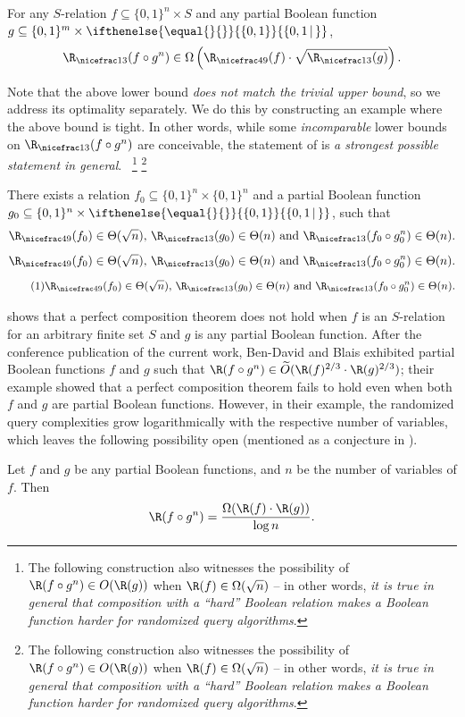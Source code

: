 \documentclass{toc}
\newcommand{\relation}{$S$-relation\xspace}     %
\newcommand{\md}{\middle}
\newcommand{\malabel}[1]{\addtocounter{equation}{1}\tag{\theequation}\label{#1}}
\newcommand{\m}[2][]{%
\ifthenelse{\equal{}{#1}}%
{\begin{align*} #2 \end{align*}}%
{\ifthenelse{\eq<ual{P}{#1}}%
{\begingroup\allowdisplaybreaks\begin{align*} #2%
\end{align*}\endgroup}%
{\begin{align*} \malabel{#1} #2 \end{align*}}%
}%
}
\newcommand{\dr}{\nicefrac}
\newcommand{\sq}{\sqrt}
\newcommand{\set}[2][]{\ifthenelse{\equal{}{#1}}%
{\ensuremath{\left\{#2\right\}}}%
{\ensuremath{\left\{#2\,\md|\,#1\right\}}}}
\newcommand{\asO}[1]{O(#1)}
\newcommand{\asOm}[1]{\Omega(#1)}
\newcommand{\asT}[1]{\Theta(#1)}
\newcommand{\OI}{\set{0,1}}
\newcommand{\txt}[1]{\textrm{#1}}  %
\newcommand{\fn}[2][]{%
\ifthenelse{\equal{}{#1}}%
{\footnote{#2}}%
{\footnote{\label{#1}#2}}%
}
\newcommand{\e}{\emph}
\begin{document}
\begin{theorem}
\label{main_theo}
For any %
\relation  %
$f \subseteq \{0,1\}^n \times S$ and any partial Boolean function
%
$g\subseteq \{0,1\}^m \times \OI$,
\[\R_{\dr13}(f \circ g^n) \in \Omega\left(\R_{\dr49}(f) \cdot \sqrt{\R_{\dr13}(g)}\right).\]
\end{theorem}

Note that the above lower bound \e{does not match the trivial upper bound}, 
%
%
so we address its optimality separately.  %
%
We do this by  %
constructing an example where the above bound is 
%
tight. In  %
other words, while some \e{incomparable} lower bounds on $\R_{\dr13}(f \circ g^n)$ are conceivable, the statement of  is \e{a strongest possible statement in general}.~\fn
{The following construction also witnesses the possibility of $\R(f\circ g^n) \in \asO{\R(g)}$ when $\R(f) \in \asOm{\sq n}$ -- in other words, \e{it is
%
true in general  %
that composition with a ``hard''  %
Boolean  %
relation makes a Boolean function harder for randomized query algorithms}.}

\begin{theorem}
\label{t_match}
There exists a    %
%
%
relation $f_0 \subseteq \{0,1\}^n \times \{0,1\}^n$ and a partial Boolean function
%
$g_0\subseteq \{0,1\}^n \times \OI$, such that
\m{
  \R_{\dr49}(f_0)\in\asT{\sq n},\,
  \R_{\dr13}(g_0)\in\asT{n}
  \txt{~and~}
  \R_{\dr13}(f_0\circ g_0^n)\in\asT{n}.}
\end{theorem}
 shows that a perfect composition theorem does not hold when $f$ is an  %
%
%
%
\relation for an arbitrary finite set $S$ and $g$ is any partial %
Boolean  %
function. After the conference publication of the current work, Ben-David and Blais \cite{DBLP:journals/corr/abs-2002-10809} %
exhibited partial Boolean functions $f$ and $g$ such that
%
$\R(f \circ g^n) \in \widetilde{O}(\R(f)^{2/3}\cdot \R(g)^{2/3})$; their example showed that a perfect composition theorem fails to hold even when both $f$ and $g$ are partial Boolean functions. However, in their example, the randomized query complexities grow logarithmically with the respective number of variables, which leaves the following possibility open (mentioned as a conjecture in \cite{DBLP:journals/corr/abs-2002-10809}).
\begin{conjecture}
Let $f$ and $g$ be any partial Boolean functions, and $n$ be the 
number of variables of $f$.  Then  
\[\R(f \circ g^n)=\frac{\Omega(\R(f)\cdot \R(g))}{\log n}.\]
\end{conjecture}
\end{document}
